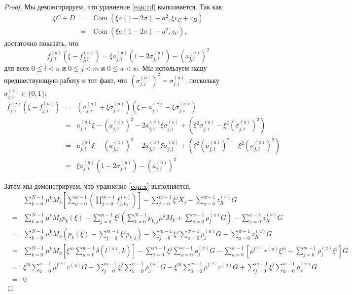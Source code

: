 \documentclass{article}
\newcommand{\com}{\operatorname{Com}}
\newcommand{\sumj}{\sum_{j=0}^{m-1}}
\newcommand{\sumk}{\sum_{k=0}^{N-1}}
\newcommand{\sumu}{\sum_{u=0}^{w-1}}
\theoremstyle{definition}
\begin{document}
\begin{proof}
Мы демонстрируем, что уравнение \ref{eqn:cd} выполняется.
Так как:
\begin{eqnarray*}
\xi C + D &=& \com(\xi a(1 - 2\sigma) - a^2,\xi r_C + r_D) \\
&=& \com(\xi a(1 - 2\sigma) - a^2,z_C),
\end{eqnarray*}
достаточно показать, что $$f_{j,i}^{(u)}\left( \xi - f_{j,i}^{(u)} \right) = \xi a_{j,i}^{(u)}\left( 1 - 2\sigma_{j,i}^{(u)} \right) - \left(a_{j,i}^{(u)}\right)^2$$ для всех $0 \leq i < n$ и $0 \leq j < m$ и $0 \leq u < w$.
Мы используем нашу предшествующую работу и тот факт, что $\left(\sigma_{j,i}^{(u)}\right)^2 = \sigma_{j,i}^{(u)}$, поскольку $\sigma_{j,i}^{(u)} \in \{0,1\}$:
\begin{eqnarray*}
f_{j,i}^{(u)}\left( \xi - f_{j,i}^{(u)} \right) &=& \left( a_{j,i}^{(u)} + \xi\sigma_{j,i}^{(u)} \right)\left( \xi - a_{j,i}^{(u)} - \xi\sigma_{j,i}^{(u)} \right) \\
&=& a_{j,i}^{(u)}\xi - \left(a_{j,i}^{(u)}\right)^2 - 2a_{j,i}^{(u)}\xi\sigma_{j,i}^{(u)} + \left( \xi^2\sigma_{j,i}^{(u)} - \xi^2\left(\sigma_{j,i}^{(u)}\right)^2 \right) \\
&=& a_{j,i}^{(u)}\xi - \left(a_{j,i}^{(u)}\right)^2 - 2a_{j,i}^{(u)}\xi\sigma_{j,i}^{(u)} + \left( \xi^2\left(\sigma_{j,i}^{(u)}\right)^2 - \xi^2\left(\sigma_{j,i}^{(u)}\right)^2 \right) \\
&=& \xi a_{j,i}^{(u)}\left( 1 - 2\sigma_{j,i}^{(u)} \right) - \left(a_{j,i}^{(u)}\right)^2
\end{eqnarray*}

Затем мы демонстрируем, что уравнение \ref{eqn:x} выполняется:
\begin{eqnarray*}
&& \sumk \mu^kM_k \left[ \sumu \left( \prod_{j=0}^{m-1} f^{(u)}_{j,k_j} \right) \right] - \sumj \xi^jX_j - \sumu z^{(u)}_RG \\
&=& \sumk \mu^kM_k p_k(\xi) - \sumj \xi^j \left( \sumk p_{k,j}\mu^kM_k + \sumu \rho^{(u)}_jG \right) - \sumu z^{(u)}_RG \\
&=& \sumk \mu^kM_k \left( p_k(\xi) - \sumj \xi^j p_{k,j} \right) - \sumj \xi^j \sumu \rho^{(u)}_jG - \sumu z^{(u)}_RG \\
&=& \sumk \mu^kM_k \left[ \xi^m \sumu \delta\left( l^{(u)},k \right) \right] - \sumj \xi^j \sumu \rho^{(u)}_jG - \sumu\left[ \mu^{l^{(u)}}r^{(u)}\xi^m - \sumj \rho^{(u)}_j\xi^j \right]G \\
&=& \xi^m\sumu \mu^{l^{(u)}}r^{(u)}G - \sumj \xi^j \sumu \rho^{(u)}_jG - \xi^m\sumu \mu^{l^{(u)}}r^{(u)}G + \sumj \xi^j \sumu \rho^{(u)}_jG \\
&=& 0
\end{eqnarray*}


\end{proof}
\end{document}
